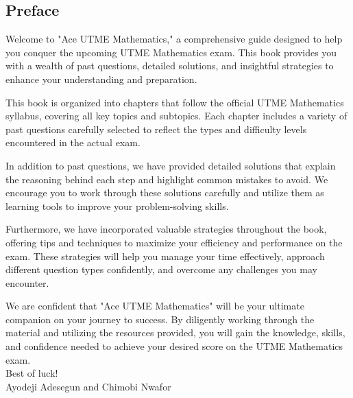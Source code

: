 \documentclass[a4paper]{book}
\begin{document}
\begin{frontmatter}
\clearpage

\tableofcontents

\chapter*{Preface}

Welcome to "Ace UTME Mathematics," a comprehensive guide designed to help you conquer the upcoming UTME Mathematics exam. This book provides you with a wealth of past questions, detailed solutions, and insightful strategies to enhance your understanding and preparation.

This book is organized into chapters that follow the official UTME Mathematics syllabus, covering all key topics and subtopics. Each chapter includes a variety of past questions carefully selected to reflect the types and difficulty levels encountered in the actual exam.

In addition to past questions, we have provided detailed solutions that explain the reasoning behind each step and highlight common mistakes to avoid. We encourage you to work through these solutions carefully and utilize them as learning tools to improve your problem-solving skills.

Furthermore, we have incorporated valuable strategies throughout the book, offering tips and techniques to maximize your efficiency and performance on the exam. These strategies will help you manage your time effectively, approach different question types confidently, and overcome any challenges you may encounter.

We are confident that "Ace UTME Mathematics" will be your ultimate companion on your journey to success. By diligently working through the material and utilizing the resources provided, you will gain the knowledge, skills, and confidence needed to achieve your desired score on the UTME Mathematics exam.\\

Best of luck!\\

Ayodeji Adesegun and Chimobi Nwafor
\clearpage
\end{frontmatter}

\mainmatter

























\begin{backmatter} %

\end{backmatter}
\end{document}

